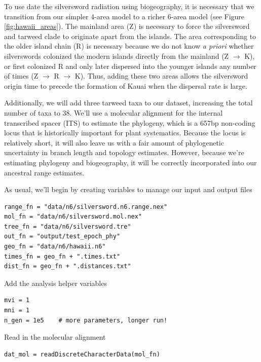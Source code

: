 To use date the silversword radiation using biogeography, it is necessary that we transition from our simpler 4-area model to a richer 6-area model (see Figure \ref{fig:hawaii_areas}).
The mainland area (Z) is necessary to force the silversword and tarweed clade to originate apart from the islands.
The area corresponding to the older island chain (R) is necessary because we do not know {\it a priori} whether silverswords colonized the modern islands directly from the mainland (Z $\rightarrow$ K), or first colonized R and only later dispersed into the younger islands any number of times (Z $\rightarrow$ R $\rightarrow$ K).
Thus, adding these two areas allows the silversword origin time to precede the formation of Kauai when the dispersal rate is large.

Additionally, we will add three tarweed taxa to our dataset, increasing the total number of taxa to 38.
We'll use a molecular alignment for the internal transcribed spacer (ITS) to estimate the phylogeny, which is a 657bp non-coding locus that is historically important for plant systematics.
Because the locus is relatively short, it will also leave us with a fair amount of phylogenetic uncertainty in branch length and topology estimates.
However, because we're estimating phylogeny and biogeography, it will be correctly incorporated into our ancestral range estimates.

As usual, we'll begin by creating variables to manage our input and output files

\begin{snugshade}
\begin{lstlisting}
range_fn = "data/n6/silversword.n6.range.nex"
mol_fn = "data/n6/silversword.mol.nex"
tree_fn = "data/n6/silversword.tre"
out_fn = "output/test_epoch_phy"
geo_fn = "data/n6/hawaii.n6"
times_fn = geo_fn + ".times.txt"
dist_fn = geo_fn + ".distances.txt"
\end{lstlisting}
\end{snugshade}

Add the analysis helper variables

\begin{snugshade}
\begin{lstlisting}
mvi = 1
mni = 1
n_gen = 1e5    # more parameters, longer run!
\end{lstlisting}
\end{snugshade}


Read in the molecular alignment

\begin{snugshade}
\begin{lstlisting}
dat_mol = readDiscreteCharacterData(mol_fn)
\end{lstlisting}
\end{snugshade}


